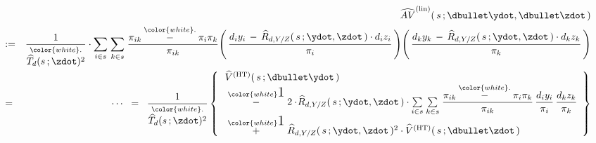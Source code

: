\begin{lemma}
\begin{enumerate}
    \begin{eqnarray*}
    &&
        \widehat{AV}^{\textnormal{(lin)}}(\,s\,;\dbullet\ydot,\dbullet\zdot\,)
    \\
    & := &
        \dfrac{1}{
            \overset{{\color{white}.}}{
                \widehat{T}_{d}(s\,;\zdot)^{2}
                }
            }
        \cdot
        \underset{i \in s}{\sum}\;
        \underset{k \in s}{\sum}\;
        \dfrac{
            \pi_{ik} \overset{{\color{white}.}}{-} \pi_{i}\pi_{k}
            }{
            \pi_{ik}
            }
        \!
        \left(\,
            \dfrac{
                d_{i}y_{i} \,-\, \widehat{R}_{d,Y/Z}(\,s\,;\ydot,\zdot\,) \cdot d_{i}z_{i}
                }{
                \pi_{i}
                }
            \,\right)
        \!
        \left(\,
            \dfrac{
                d_{k}y_{k} \,-\, \widehat{R}_{d,Y/Z}(\,s\,;\ydot,\zdot\,) \cdot d_{k}z_{k}
                }{
                \pi_{k}
                }
            \,\right)
    \\
    & = &
        \cdots
    \;\; = \;\;
        \dfrac{
            1
            }{
            \overset{{\color{white}.}}{
                \widehat{T}_{d}(s\,;\zdot)^{2}
                }
            }
        \left\{\,
            \begin{array}{l}
                \widehat{V}^{\textnormal{(HT)}}(\,s\,;\dbullet\ydot\,)
                \\
                \; \overset{{\color{white}\textnormal{\Large$1$}}}{-} \;
                2\cdot\!
                \widehat{R}_{d,Y/Z}(\,s\,;\ydot,\zdot\,)
                \cdot
                \underset{i \in s}{\sum}\;
                \underset{k \in s}{\sum}\;
                \dfrac{
                    \pi_{ik} \overset{{\color{white}.}}{-} \pi_{i}\pi_{k}
                    }{
                    \pi_{ik}
                    }
                \,
                \dfrac{d_{i}y_{i}}{\pi_{i}}
                \,
                \dfrac{d_{k}z_{k}}{\pi_{k}}
                \\
                \; \overset{{\color{white}\textnormal{\Large$1$}}}{+} \;
                \widehat{R}_{d,Y/Z}(\,s\,;\ydot,\zdot\,)^{2}
                \cdot
                \widehat{V}^{\textnormal{(HT)}}(\,s\,;\dbullet\zdot\,)
                \end{array}
            \right\}
    \end{eqnarray*}
\end{enumerate}
\end{lemma}
\proof
